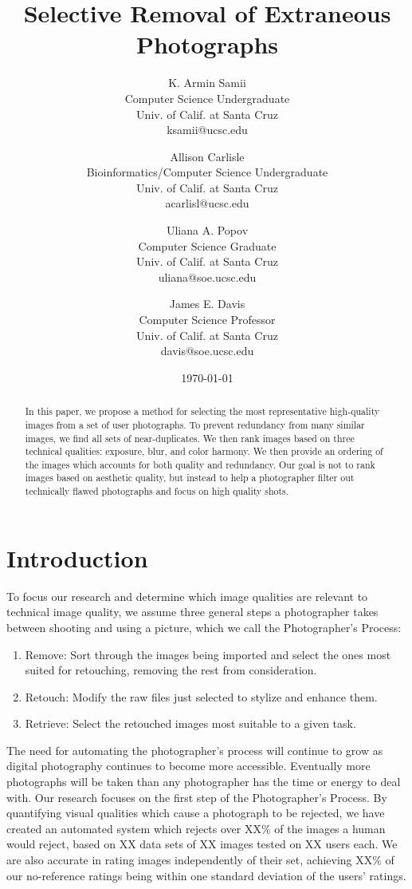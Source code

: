 \documentclass[twocolumn]{article}
\title{
Selective Removal of Extraneous Photographs
}
\author{
K. Armin Samii\\
Computer Science Undergraduate\\
Univ. of Calif. at Santa Cruz\\
ksamii@ucsc.edu
\and
Allison Carlisle\\
Bioinformatics/Computer Science Undergraduate\\
Univ. of Calif. at Santa Cruz\\
acarlisl@ucsc.edu
\and
Uliana A. Popov\\
Computer Science Graduate\\
Univ. of Calif. at Santa Cruz\\
uliana@soe.ucsc.edu
\and
James E. Davis\\
Computer Science Professor\\
Univ. of Calif. at Santa Cruz\\
davis@soe.ucsc.edu
}
\date{\today}
\begin{document}
\maketitle
\begin{abstract}
In this paper, we propose a method for selecting the most representative high-quality images from a set of user photographs. To prevent redundancy from many similar images, we find all sets of near-duplicates. We then rank images based on three technical qualities: exposure, blur, and color harmony. We then provide an ordering of the images which accounts for both quality and redundancy. Our goal is not to rank images based on aesthetic quality, but instead to help a photographer filter out technically flawed photographs and focus on high quality shots.
\end{abstract}

\section{Introduction}
To focus our research and determine which image qualities are relevant to technical image quality, we assume three general steps a photographer takes between shooting and using a picture, which we call the Photographer's Process:
\begin{enumerate}
\item Remove: Sort through the images being imported and select the ones most suited for retouching, removing the rest from consideration.
\item Retouch: Modify the raw files just selected to stylize and enhance them.
\item Retrieve: Select the retouched images most suitable to a given task.
\end{enumerate}
The need for automating the photographer's process will continue to grow as digital photography continues to become more accessible.  Eventually more photographs will be taken than any photographer has the time or energy to deal with.  Our research focuses on the first step of the Photographer's Process. By quantifying visual qualities which cause a photograph to be rejected, we have created an automated system which rejects over XX\% of the images a human would reject, based on XX data sets of XX images tested on XX users each. We are also accurate in rating images independently of their set, achieving XX\% of our no-reference ratings being within one standard deviation of the users' ratings.
\end{document}
